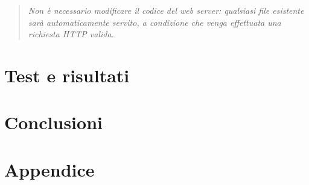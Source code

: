 \documentclass[a4paper,12pt]{report}
\begin{document}
\begin{quote}
    \textit{Non è necessario modificare il codice del web server: qualsiasi file esistente sarà automaticamente servito, a condizione che venga effettuata una richiesta HTTP valida.}
\end{quote}


\chapter{Test e risultati}

\chapter{Conclusioni}

\chapter{Appendice}
\end{document}
